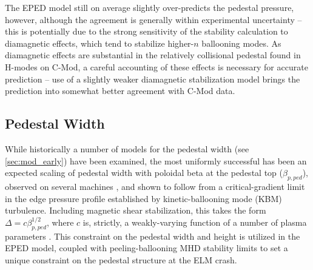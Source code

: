 The EPED model still on average slightly over-predicts the pedestal pressure, however, although the agreement is generally within experimental uncertainty -- this is potentially due to the strong sensitivity of the stability calculation to diamagnetic effects, which tend to stabilize higher-$n$ ballooning modes.  As diamagnetic effects are substantial in the relatively collisional pedestal found in H-modes on C-Mod, a careful accounting of these effects is necessary for accurate prediction -- use of a slightly weaker diamagnetic stabilization model brings the prediction into somewhat better agreement with C-Mod data.

\begin{figure}[t]
 \pushtooutside
\end{figure}

\subsection{Pedestal Width}\label{subsec:elmy_eped_width}

While historically a number of models for the pedestal width (see \cref{sec:mod_early}) have been examined, the most uniformly successful has been an expected scaling of pedestal width with poloidal beta at the pedestal top ($\beta_{p,ped}$), observed on several machines \cite{Groebner2013}, and shown to follow from a critical-gradient limit in the edge pressure profile established by kinetic-ballooning mode (KBM) turbulence.  Including magnetic shear stabilization, this takes the form $\Delta = c \beta_{p,ped}^{1/2}$, where $c$ is, strictly, a weakly-varying function of a number of plasma parameters \cite{Snyder2009}.  This constraint on the pedestal width and height is utilized in the EPED model, coupled with peeling-ballooning MHD stability limits to set a unique constraint on the pedestal structure at the ELM crash.

